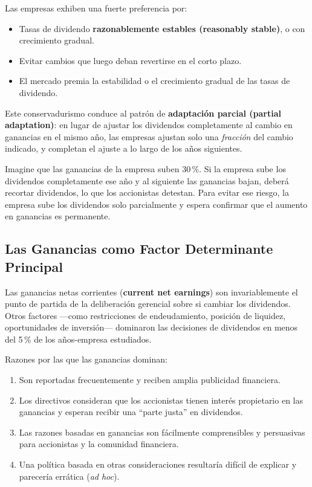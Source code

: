 \documentclass[12pt]{article}
\begin{document}
Las empresas exhiben una fuerte preferencia por:
\begin{itemize}
  \item Tasas de dividendo \textbf{razonablemente estables (reasonably stable)}, o con
        crecimiento gradual.
  \item Evitar cambios que luego deban revertirse en el corto plazo.
  \item El mercado premia la estabilidad o el crecimiento gradual de las tasas de dividendo.
\end{itemize}

Este conservadurismo conduce al patr\'on de \textbf{adaptaci\'on parcial (partial adaptation)}:
en lugar de ajustar los dividendos completamente al cambio en ganancias en el mismo a\~no, las
empresas ajustan solo una \textit{fracci\'on} del cambio indicado, y completan el ajuste a lo
largo de los a\~nos siguientes.

\begin{intuicion}
Imagine que las ganancias de la empresa suben 30\,\%. Si la empresa sube los dividendos
completamente ese a\~no y al siguiente las ganancias bajan, deber\'a recortar dividendos,
lo que los accionistas detestan. Para evitar ese riesgo, la empresa sube los dividendos
solo parcialmente y espera confirmar que el aumento en ganancias es permanente.
\end{intuicion}

\subsection{Las Ganancias como Factor Determinante Principal}

Las ganancias netas corrientes (\textbf{current net earnings}) son invariablemente el punto
de partida de la deliberaci\'on gerencial sobre si cambiar los dividendos. Otros factores
---como restricciones de endeudamiento, posici\'on de liquidez, oportunidades de inversi\'on---
dominaron las decisiones de dividendos en menos del 5\,\% de los a\~nos-empresa estudiados.

Razones por las que las ganancias dominan:
\begin{enumerate}
  \item Son reportadas frecuentemente y reciben amplia publicidad financiera.
  \item Los directivos consideran que los accionistas tienen inter\'es propietario
        en las ganancias y esperan recibir una ``parte justa'' en dividendos.
  \item Las razones basadas en ganancias son f\'acilmente comprensibles y persuasivas
        para accionistas y la comunidad financiera.
  \item Una pol\'itica basada en otras consideraciones resultar\'ia dif\'icil de explicar
        y parecer\'ia errática (\textit{ad hoc}).
\end{enumerate}
\end{document}
